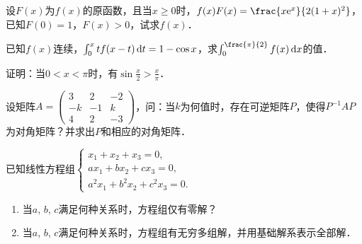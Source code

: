 \documentclass[plain,noanswer,medmath]{../../template/jnuexam}
\begin{document}










\begin{problem}
设$F(x)$为$f(x)$的原函数，且当$x \ge 0$时，$f(x)F(x) = \frac{x\e^x}{2(1 + x)^2}$，
已知$F(0) = 1$，$F(x) > 0$，试求$f(x)$．
\end{problem}



\begin{problem}
已知$f(x)$连续，$\int_0^x t f(x - t)\mathop{}\!\mathrm{d} t = 1 - \cos x$，求$\int_0^{\frac{\pi}{2}} f (x)\dx$的值．
\end{problem}



\begin{problem}
证明：当$0 < x < \pi$时，有$\sin \frac{x}{2} > \frac{x}{\pi}$．
\end{problem}



\begin{problem}
设矩阵$A = \begin{pmatrix}
   3 &  2 & -2 \\
  -k & -1 & k \\
   4 &  2 & -3
\end{pmatrix}$，问：当$k$为何值时，存在可逆矩阵$P$，使得$P^{-1} AP$为对角矩阵？并求出$P$和相应的对角矩阵．
\end{problem}



\begin{problem}
已知线性方程组$\begin{cases}
  x_1 + x_2 + x_3 = 0, \\
  ax_1 + bx_2 + cx_3 = 0, \\
  a^2x_1 + b^2x_2 + c^2x_3 = 0.
\end{cases}$
\begin{enumerate}
\item 当$a$, $b$, $c$满足何种关系时，方程组仅有零解？
\item 当$a$, $b$, $c$满足何种关系时，方程组有无穷多组解，并用基础解系表示全部解．
\end{enumerate}
\end{problem}
\end{document}
